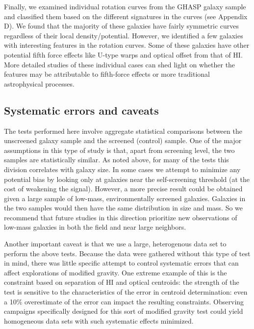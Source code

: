 \documentclass{emulateapj}
\begin{document}
Finally, we examined individual rotation curves from the GHASP 
galaxy sample and classified them based on the different signatures 
in the curves (see Appendix D). We found that the majority of these galaxies 
have fairly symmetric curves regardless
of their local density/potential. However, we identified a 
few galaxies with interesting features in the rotation curves.
Some of these galaxies have other potential fifth force effects
like U-type warps and optical offset from that of HI.
More detailed studies of these individual cases can shed light
on whether the features may be attributable to fifth-force effects or
more traditional astrophysical processes.


\subsection{Systematic errors and caveats}
\label{sec:caveat}
The  tests performed here involve aggregate statistical
comparisons between the unscreened galaxy sample and the screened (control) sample.
One of the major assumptions in this type of study is that, apart
from screening level, the two samples are statistically similar.  As noted
above, for many of the tests this division correlates with galaxy size. 
In some cases we attempt to minimize any potential bias
by looking only at galaxies near the self-screening threshold (at the cost
of weakening the signal).  However,
a more precise result could be obtained given a large sample of low-mass,
environmentally screened galaxies.  Galaxies in the two samples would then
have the same distribution in size and mass. So we recommend that
future studies in this direction prioritize new observations of low-mass
galaxies in both the field and near large neighbors.

Another important caveat is that we use a large, heterogenous data set to
perform the above tests.  Because the data were gathered without this
type of test in mind, there was little specific attempt to control
systematic errors that can affect explorations of modified gravity.
One extreme example of this is the constraint based on separation of
HI and optical centroids: the strength of the test is sensitive to the
 characteristics of the error in centroid determination: even a
10\% overestimate of the error can impact the
resulting constraints.  Observing campaigns specifically designed for this
sort of modified gravity test could yield homogeneous data sets with such
systematic effects minimized.
\end{document}

